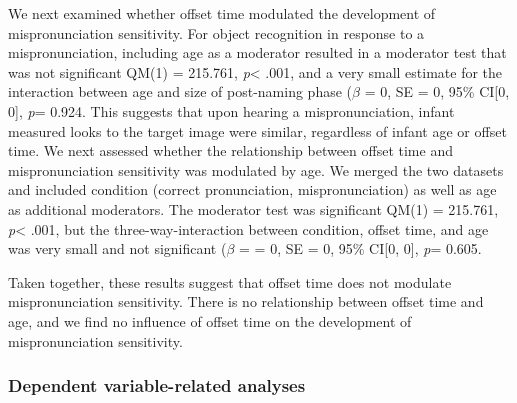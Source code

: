 \documentclass[man]{apa6}
\theoremstyle{definition}
\theoremstyle{definition}
\theoremstyle{definition}
\theoremstyle{remark}
\begin{document}
We next examined whether offset time modulated the development of
mispronunciation sensitivity. For object recognition in response to a
mispronunciation, including age as a moderator resulted in a moderator
test that was not significant QM(1) = 215.761, \emph{p}\textless{} .001,
and a very small estimate for the interaction between age and size of
post-naming phase (\(\beta\) = 0, SE = 0, 95\% CI{[}0, 0{]}, \emph{p}=
0.924. This suggests that upon hearing a mispronunciation, infant
measured looks to the target image were similar, regardless of infant
age or offset time. We next assessed whether the relationship between
offset time and mispronunciation sensitivity was modulated by age. We
merged the two datasets and included condition (correct pronunciation,
mispronunciation) as well as age as additional moderators. The moderator
test was significant QM(1) = 215.761, \emph{p}\textless{} .001, but the
three-way-interaction between condition, offset time, and age was very
small and not significant (\(\beta\) = = 0, SE = 0, 95\% CI{[}0, 0{]},
\emph{p}= 0.605.

Taken together, these results suggest that offset time does not modulate
mispronunciation sensitivity. There is no relationship between offset
time and age, and we find no influence of offset time on the development
of mispronunciation sensitivity.

\subsubsection{Dependent variable-related
analyses}\label{dependent-variable-related-analyses}
\end{document}
